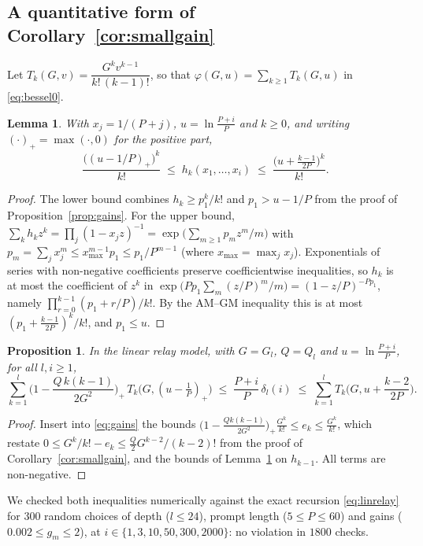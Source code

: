 \documentclass[11pt]{article}
\newtheorem{lemma}{Lemma}
\newtheorem{proposition}{Proposition}
\theoremstyle{definition}
\theoremstyle{remark}
\begin{document}
\subsection{A quantitative form of Corollary~\ref{cor:smallgain}}

Let $T_k(G,v)=\dfrac{G^kv^{k-1}}{k!\,(k-1)!}$, so that $\varphi(G,u)=\sum_{k\ge1}T_k(G,u)$ in \eqref{eq:bessel0}.

\begin{lemma}\label{lem:hbounds}
With $x_j=1/(P+j)$, $u=\ln\frac{P+i}{P}$ and $k\ge0$, and writing $(\cdot)_+=\max(\cdot,0)$ for the positive part,
\[
\frac{\big((u-1/P)_+\big)^{k}}{k!}\;\le\;h_k(x_1,\dots,x_i)\;\le\;\frac{\big(u+\frac{k-1}{2P}\big)^{k}}{k!}.
\]
\end{lemma}
\begin{proof}
The lower bound combines $h_k\ge p_1^k/k!$ and $p_1>u-1/P$ from the proof of Proposition~\ref{prop:gains}. For the upper bound, $\sum_kh_kz^k=\prod_j(1-x_jz)^{-1}=\exp\big(\sum_{m\ge1}p_mz^m/m\big)$ with $p_m=\sum_jx_j^m\le x_{\max}^{m-1}p_1\le p_1/P^{m-1}$ (where $x_{\max}=\max_jx_j$). Exponentials of series with non-negative coefficients preserve coefficientwise inequalities, so $h_k$ is at most the coefficient of $z^k$ in $\exp\big(Pp_1\sum_m(z/P)^m/m\big)=(1-z/P)^{-Pp_1}$, namely $\prod_{r=0}^{k-1}(p_1+r/P)/k!$. By the AM--GM inequality this is at most $(p_1+\frac{k-1}{2P})^k/k!$, and $p_1\le u$.
\end{proof}

\begin{proposition}\label{prop:sandwich}
In the linear relay model, with $G=G_l$, $Q=Q_l$ and $u=\ln\frac{P+i}{P}$, for all $l,i\ge1$,
\[
\sum_{k=1}^{l}\Big(1-\frac{Q\,k(k-1)}{2G^2}\Big)_+\,T_k\big(G,(u-\tfrac1P)_+\big)\;\le\;\frac{P+i}{P}\,\delta_l(i)\;\le\;\sum_{k=1}^{l}T_k\Big(G,u+\frac{k-2}{2P}\Big).
\]
\end{proposition}
\begin{proof}
Insert into \eqref{eq:gains} the bounds $\big(1-\frac{Qk(k-1)}{2G^2}\big)_+\frac{G^k}{k!}\le e_k\le\frac{G^k}{k!}$, which restate $0\le G^k/k!-e_k\le\frac Q2G^{k-2}/(k-2)!$ from the proof of Corollary~\ref{cor:smallgain}, and the bounds of Lemma~\ref{lem:hbounds} on $h_{k-1}$. All terms are non-negative.
\end{proof}

We checked both inequalities numerically against the exact recursion \eqref{eq:linrelay} for 300 random choices of depth ($l\le24$), prompt length ($5\le P\le60$) and gains ($0.002\le g_m\le2$), at $i\in\{1,3,10,50,300,2000\}$: no violation in $1800$ checks.
\end{document}
